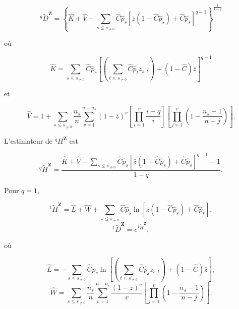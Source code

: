 \documentclass[
  11pt,
  french,
  a4paper,
  extrafontsizes,onecolumn,openright
  ]{memoir}
\begin{document}
\begin{equation}
  \label{eq:EstDqz}
  ^q\!{\tilde{D}}^{\mathbf{Z}}
  = {\left\{\hat{K}+\hat{V}
    -\sum_{s\le s_{\ne 0}}{\hat{C}\hat{p}_s{\left[\bar{z}\left(1-\hat{C}\hat{p}_s\right)+\hat{C}\hat{p}_s\right]}^{q-1}}\right\}}
      ^{\frac{1}{1-q}}
\end{equation}

où

\begin{equation}
   \label{eq:EstKDqz}
 \hat{K}=\sum_{s\le s_{\ne 0}}{\hat{C}\hat{p}_s{\left[\left(\sum_{t\le s_{\ne 0}}{\hat{C}\hat{p}_t z_{s,t}}\right)+\left(1-\hat{C}\right)\bar{z}\right]}^{q-1}}
\end{equation}

et

\begin{equation}
  \label{eq:EstVDqz}
  \hat{V}=1+\sum_{s\le s_{\ne 0}}{\frac{n_s}{n}\sum^{n-n_s}_{v=1}{{\left(1-\bar{z}\right)}^v\left[\prod^v_{i=1}{\frac{i-q}{i}}\right]\left[\prod^v_{j=1}{\left(1-\frac{n_s-1}{n-j}\right)}\right]}}.
\end{equation}

L'estimateur de \(^q\!H^{\mathbf{Z}}\) est

\begin{equation}
  \label{eq:EstHqz2}
  ^q\!{\tilde{H}}^{\mathbf{Z}}
  = \frac{\hat{K}+\hat{V}-\sum_{s\le s_{\ne 0}}{\hat{C}\hat{p}_s{\left[\bar{z}\left(1-\hat{C}\hat{p}_s\right)+\hat{C}\hat{p}_s\right]}^{q-1}}-1}{1-q}.
\end{equation}

Pour \(q=1\),

\begin{equation}
  \label{eq:EstH1z2}
  ^1\!{\tilde{H}}^{\mathbf{Z}}
  = \hat{L}+\hat{W}+\sum_{s\le s_{\ne 0}}{\hat{C}\hat{p}_s\ln\left[\bar{z}\left(1-\hat{C}\hat{p}_s\right)+\hat{C}\hat{p}_s\right]},
\end{equation}
\begin{equation}
  ^1\!{\tilde{D}}^{\mathbf{Z}}=e^{^1\!{\tilde{H}}^{\mathbf{Z}}},
\end{equation}

où

\begin{equation}
  \label{eq:EstLHqz2}
  \hat{L}=-\sum_{s\le s_{\ne 0}}{\hat{C}\hat{p}_s \ln\left[\left(\sum_{t\le s_{\ne 0}}{{\hat{C}\hat{p}}_jz_{s,t}}\right)+\left(1-\hat{C}\right)\bar{z}\right]},
\end{equation}
\begin{equation}
  \hat{W}=\sum_{s\le s_{\ne 0}}{\frac{n_s}{n}\sum^{n-n_s}_{v=1}{\frac{{\left(1-\bar{z}\right)}^v}{v}\left[\prod^v_{j=1}{\left(1-\frac{n_s-1}{n-j}\right)}\right]}}.
\end{equation}
\end{document}
